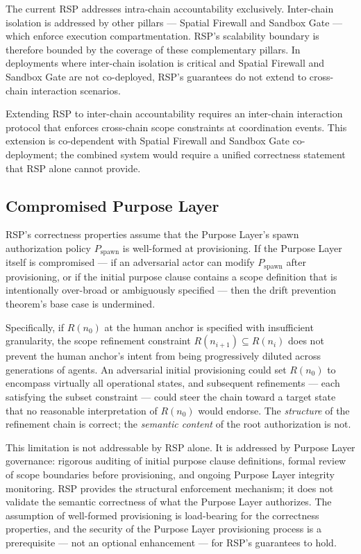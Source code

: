 The current RSP addresses intra-chain accountability exclusively. Inter-chain isolation is addressed by other \bxthree pillars — Spatial Firewall and Sandbox Gate — which enforce execution compartmentation. RSP's scalability boundary is therefore bounded by the coverage of these complementary pillars. In deployments where inter-chain isolation is critical and Spatial Firewall and Sandbox Gate are not co-deployed, RSP's guarantees do not extend to cross-chain interaction scenarios.

Extending RSP to inter-chain accountability requires an inter-chain interaction protocol that enforces cross-chain scope constraints at coordination events. This extension is co-dependent with Spatial Firewall and Sandbox Gate co-deployment; the combined system would require a unified correctness statement that RSP alone cannot provide.

\subsection{Compromised Purpose Layer}
\label{sec:rs-limitations-purpose-layer}

RSP's correctness properties assume that the Purpose Layer's spawn authorization policy $P_{\mathrm{spawn}}$ is well-formed at provisioning. If the Purpose Layer itself is compromised — if an adversarial actor can modify $P_{\mathrm{spawn}}$ after provisioning, or if the initial purpose clause contains a scope definition that is intentionally over-broad or ambiguously specified — then the drift prevention theorem's base case is undermined.

Specifically, if $R(n_0)$ at the human anchor is specified with insufficient granularity, the scope refinement constraint $R(n_{i+1}) \subseteq R(n_i)$ does not prevent the human anchor's intent from being progressively diluted across generations of agents. An adversarial initial provisioning could set $R(n_0)$ to encompass virtually all operational states, and subsequent refinements — each satisfying the subset constraint — could steer the chain toward a target state that no reasonable interpretation of $R(n_0)$ would endorse. The \emph{structure} of the refinement chain is correct; the \emph{semantic content} of the root authorization is not.

This limitation is not addressable by RSP alone. It is addressed by Purpose Layer governance: rigorous auditing of initial purpose clause definitions, formal review of scope boundaries before provisioning, and ongoing Purpose Layer integrity monitoring. RSP provides the structural enforcement mechanism; it does not validate the semantic correctness of what the Purpose Layer authorizes. The assumption of well-formed provisioning is load-bearing for the correctness properties, and the security of the Purpose Layer provisioning process is a prerequisite — not an optional enhancement — for RSP's guarantees to hold.

